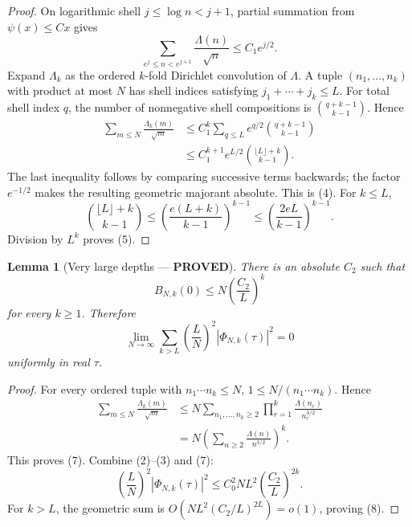 \documentclass[11pt]{article}
\newcommand{\PROVED}{\textcolor{green!40!black}{\textbf{PROVED}}}
\newtheorem{lemma}{Lemma}
\begin{document}
\begin{proof}
On logarithmic shell $j\le\log n<j+1$, partial summation from
$\psi(x)\le Cx$ gives
\begin{equation}
 \sum_{e^j\le n<e^{j+1}}\frac{\Lambda(n)}{\sqrt n}
 \le C_1e^{j/2}.                                          \tag{6}
\end{equation}
Expand $\Lambda_k$ as the ordered $k$-fold Dirichlet convolution of
$\Lambda$.  A tuple $(n_1,\ldots,n_k)$ with product at most $N$ has shell
indices satisfying $j_1+\cdots+j_k\le L$.  For total shell index $q$, the
number of nonnegative shell compositions is
$\binom{q+k-1}{k-1}$.  Hence
\begin{align*}
 \sum_{m\le N}\frac{\Lambda_k(m)}{\sqrt m}
 &\le C_1^k
 \sum_{q\le L}e^{q/2}\binom{q+k-1}{k-1}\\
 &\le C_1^{k+1}e^{L/2}
       \binom{\lfloor L\rfloor+k}{k-1}.
\end{align*}
The last inequality follows by comparing successive terms backwards; the
factor $e^{-1/2}$ makes the resulting geometric majorant absolute.  This
is (4).  For $k\le L$,
\[
 \binom{\lfloor L\rfloor+k}{k-1}
 \le\left(\frac{e(L+k)}{k-1}\right)^{k-1}
 \le\left(\frac{2eL}{k-1}\right)^{k-1}.
\]
Division by $L^k$ proves (5).
\end{proof}

\begin{lemma}[Very large depths --- \PROVED]
There is an absolute $C_2$ such that
\begin{equation}
 B_{N,k}(0)\le N\left(\frac{C_2}{L}\right)^k              \tag{7}
\end{equation}
for every $k\ge1$.  Therefore
\begin{equation}
 \lim_{N\to\infty}
 \sum_{k>L}
 \left(\frac L N\right)^2
 |\Phi_{N,k}(\tau)|^2=0                                   \tag{8}
\end{equation}
uniformly in real $\tau$.
\end{lemma}

\begin{proof}
For every ordered tuple with $n_1\cdots n_k\le N$,
$1\le N/(n_1\cdots n_k)$.  Hence
\begin{align*}
 \sum_{m\le N}\frac{\Lambda_k(m)}{\sqrt m}
 &\le N
 \sum_{n_1,\ldots,n_k\ge2}
 \prod_{r=1}^k\frac{\Lambda(n_r)}{n_r^{3/2}}\\
 &=N\left(\sum_{n\ge2}\frac{\Lambda(n)}{n^{3/2}}\right)^k.
\end{align*}
This proves (7).  Combine (2)--(3) and (7):
\[
 \left(\frac L N\right)^2|\Phi_{N,k}(\tau)|^2
 \le C_0^2NL^2\left(\frac{C_2}{L}\right)^{2k}.
\]
For $k>L$, the geometric sum is
$O(NL^2(C_2/L)^{2L})=o(1)$, proving (8).
\end{proof}
\end{document}
